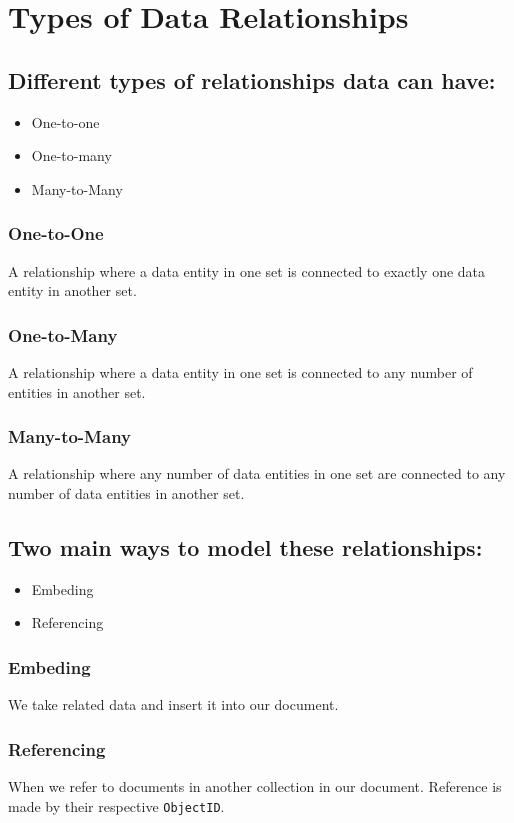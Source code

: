 \documentclass[../main.tex]{subfiles}
\begin{document}
\section{Types of Data Relationships}
\subsection{Different types of relationships data can have: }
\begin{itemize}
	\item{One-to-one}
	\item{One-to-many}
	\item{Many-to-Many}
\end{itemize}

\subsubsection{One-to-One}
A relationship where a data entity in one set is connected to exactly one data entity in another set.

\subsubsection{One-to-Many}
A relationship where a data entity in one set is connected to any number of entities in another set.
\subsubsection{Many-to-Many}
A relationship where any number of data entities in one set are connected to any number of data entities in another set.


\subsection{Two main ways to model these relationships: }
\begin{itemize}
	\item{Embeding}
	\item{Referencing}
\end{itemize}
\subsubsection{Embeding}
We take related data and insert it into our document.
\subsubsection{Referencing}
When we refer to documents in another collection in our document. Reference is made by their respective \lstinline{ObjectID}.
\end{document}
